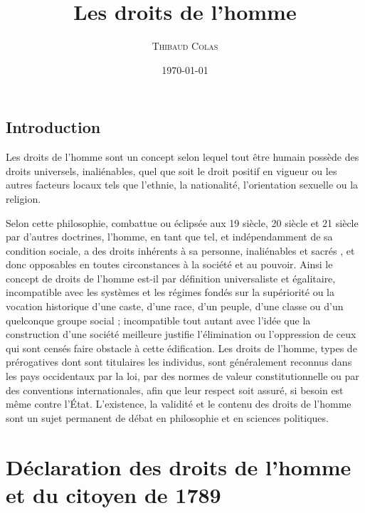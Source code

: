 \documentclass{book}
\title{Les droits de l'homme}		%
\author{\textsc{Thibaud Colas}}		%
\date{\today}					%
\begin{document}
\pagestyle{fancy}

\renewcommand{\headheight}{13pt}  
\renewcommand{\headrulewidth}{2pt} 
\renewcommand{\footrulewidth}{2pt} 
\renewcommand{\headsep}{15pt}
\lhead{\rightmark }
\chead{}
\rhead{\leftmark }
\rfoot{\thepage}

\maketitle					%

\frontmatter				%
\chapter{Introduction}
\begin{it}
	\large{
Les droits de l'homme sont un concept selon lequel tout être humain possède des droits universels, inaliénables, quel que soit le droit positif en vigueur ou les autres facteurs locaux tels que l'ethnie, la nationalité, l'orientation sexuelle ou la religion.

Selon cette philosophie, combattue ou éclipsée aux 19 siècle, 20 siècle et 21 siècle par d’autres doctrines, l’homme, en tant que tel, et indépendamment de sa condition sociale, a des droits \og inhérents à sa personne, inaliénables et sacrés \fg, et donc opposables en toutes circonstances à la société et au pouvoir. Ainsi le concept de droits de l’homme est-il par définition universaliste et égalitaire, incompatible avec les systèmes et les régimes fondés sur la supériorité ou la \og vocation historique \fg d’une caste, d’une race, d’un peuple, d’une classe ou d’un quelconque groupe social ; incompatible tout autant avec l’idée que la construction d’une société meilleure justifie l’élimination ou l’oppression de ceux qui sont censés faire obstacle à cette édification.
Les droits de l'homme, types de prérogatives dont sont titulaires les individus, sont généralement reconnus dans les pays occidentaux par la loi, par des normes de valeur constitutionnelle ou par des conventions internationales, afin que leur respect soit assuré, si besoin est même contre l'État. L'existence, la validité et le contenu des droits de l'homme sont un sujet permanent de débat en philosophie et en sciences politiques.
	}
\end{it}

\mainmatter				%

\part{Déclaration des droits de l’homme et du citoyen de 1789}
\end{document}
